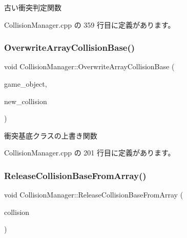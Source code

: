 古い衝突判定関数 



 Collision\+Manager.\+cpp の 359 行目に定義があります。

\mbox{\label{class_collision_manager_af9c2ce87e0189cdd1256c83decc64673}} 
\subsubsection{\texorpdfstring{Overwrite\+Array\+Collision\+Base()}{OverwriteArrayCollisionBase()}}
{\footnotesize\ttfamily void Collision\+Manager\+::\+Overwrite\+Array\+Collision\+Base (\begin{DoxyParamCaption}\item[{\mbox{\hyperlink{class_game_object_base}{Game\+Object\+Base}} $\ast$}]{game\+\_\+object,  }\item[{\mbox{\hyperlink{class_collision_base}{Collision\+Base}} $\ast$}]{new\+\_\+collision }\end{DoxyParamCaption})}



衝突基底クラスの上書き関数 



 Collision\+Manager.\+cpp の 201 行目に定義があります。

\mbox{\label{class_collision_manager_a34318163f4256cebc7aefb95fc475030}} 
\subsubsection{\texorpdfstring{Release\+Collision\+Base\+From\+Array()}{ReleaseCollisionBaseFromArray()}}
{\footnotesize\ttfamily void Collision\+Manager\+::\+Release\+Collision\+Base\+From\+Array (\begin{DoxyParamCaption}\item[{\mbox{\hyperlink{class_collision_base}{Collision\+Base}} $\ast$}]{collision }\end{DoxyParamCaption})}



